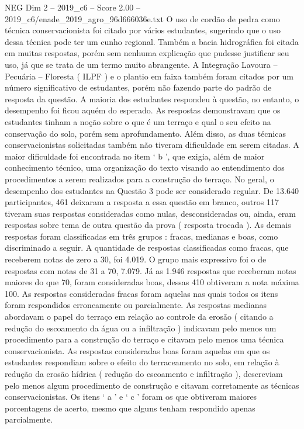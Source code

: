 \begin{textsample}{NEG Dim 2 – 2019\_c6 – Score 2.00 – 2019\_c6/enade\_2019\_agro\_96d666036e.txt}
O uso de cordão de pedra como técnica conservacionista foi citado por vários estudantes, sugerindo que o uso dessa técnica pode ter um cunho regional.
Também a bacia hidrográfica foi citada em muitas respostas, porém sem nenhuma explicação que pudesse justificar seu uso, já que se trata de um termo muito abrangente.
A Integração Lavoura – Pecuária – Floresta ( ILPF ) e o plantio em faixa também foram citados por um número significativo de estudantes, porém não fazendo parte do padrão de resposta da questão.
A maioria dos estudantes respondeu à questão, no entanto, o desempenho foi ficou aquém do esperado.
As respostas demonstravam que os estudantes tinham a noção sobre o que é um terraço e qual o seu efeito na conservação do solo, porém sem aprofundamento.
Além disso, as duas técnicas conservacionistas solicitadas também não tiveram dificuldade em serem citadas.
A maior dificuldade foi encontrada no item ‘ b ’, que exigia, além de maior conhecimento técnico, uma organização do texto visando ao entendimento dos procedimentos a serem realizados para a construção do terraço.
No geral, o desempenho dos estudantes na Questão 3 pode ser considerado regular.
De 13.640 participantes, 461 deixaram a resposta a essa questão em branco, outros 117 tiveram suas respostas consideradas como nulas, desconsideradas ou, ainda, eram respostas sobre tema de outra questão da prova ( resposta trocada ).
As demais respostas foram classificadas em três grupos : fracas, medianas e boas, como discriminado a seguir.
A quantidade de respostas classificadas como fracas, que receberem notas de zero a 30, foi 4.019.
O grupo mais expressivo foi o de respostas com notas de 31 a 70, 7.079.
Já as 1.946 respostas que receberam notas maiores do que 70, foram consideradas boas, dessas 410 obtiveram a nota máxima 100.
As respostas consideradas fracas foram aquelas nas quais todos os itens foram respondidos erroneamente ou parcialmente.
As respostas medianas abordavam o papel do terraço em relação ao controle da erosão ( citando a redução do escoamento da água ou a infiltração ) indicavam pelo menos um procedimento para a construção do terraço e citavam pelo menos uma técnica conservacionista.
As respostas consideradas boas foram aquelas em que os estudantes respondiam sobre o efeito do terraceamento no solo, em relação à redução da erosão hídrica ( redução do escoamento e infiltração ), descreviam pelo menos algum procedimento de construção e citavam corretamente as técnicas conservacionistas.
Os itens ‘ a ’ e ‘ c ’ foram os que obtiveram maiores porcentagens de acerto, mesmo que alguns tenham respondido apenas parcialmente.

\end{textsample}
